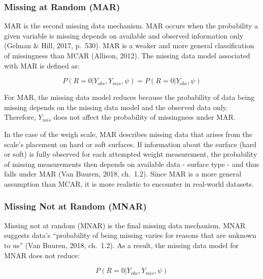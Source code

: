 \documentclass[12pt,oneside]{chicagocapstone}
\begin{document}
\subsubsection*{Missing at Random (MAR)}\label{mar}

MAR is the second missing data mechanism. MAR occurs when the
probability a given variable is missing depends on available and
observed information only (Gelman \& Hill, 2017, p.~530). MAR is a
weaker and more general classification of missingness than MCAR
(Allison, 2012). The missing data model associated with MAR is defined
as:

\[P(R=0|Y_{obs},Y_{mis},\psi) = P(R=0|Y_{obs},\psi)\]

For MAR, the missing data model reduces because the probability of data
being missing depends on the missing data model and the observed data
only. Therefore, \(Y_{mis}\) does not affect the probability of
missingness under MAR.

In the case of the weigh scale, MAR describes missing data that arises
from the scale's placement on hard or soft surfaces. If information
about the surface (hard or soft) is fully observed for each attempted
weight measurement, the probability of missing measurements then depends
on available data - surface type - and thus falls under MAR (Van Buuren,
2018, ch.~1.2). Since MAR is a more general assumption than MCAR, it is
more realistic to encounter in real-world datasets.

\subsubsection*{Missing Not at Random (MNAR)}\label{mnar}

Missing not at random (MNAR) is the final missing data mechanism. MNAR
suggests data's ``probability of being missing varies for reasons that
are unknown to us'' (Van Buuren, 2018, ch.~1.2). As a result, the
missing data model for MNAR does not reduce:

\[P(R=0|Y_{obs},Y_{mis},\psi)\]
\end{document}
